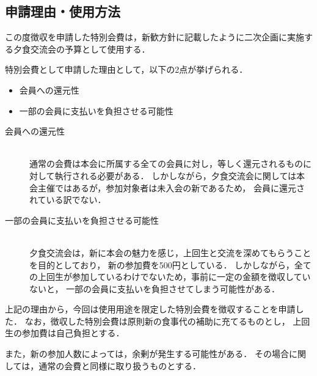 \subsection*{申請理由・使用方法}

この度徴収を申請した特別会費は，新歓方針に記載したように二次企画に実施する夕食交流会の予算として使用する．

特別会費として申請した理由として，以下の2点が挙げられる．
\begin{itemize}
    \item 会員への還元性
    \item 一部の会員に支払いを負担させる可能性
\end{itemize}

\begin{description}
    \item[会員への還元性]\mbox{}\\ %
        通常の会費は本会に所属する全ての会員に対し，等しく還元されるものに対して執行される必要がある．
        しかしながら，夕食交流会に関しては本会主催ではあるが，参加対象者は未入会の新\firstGrade{}であるため，
        会員に還元されている訳でない．

    \item[一部の会員に支払いを負担させる可能性]\mbox{}\\ %
        夕食交流会は，新\firstGrade{}に本会の魅力を感じ，上回生と交流を深めてもらうことを目的としており，
        新\firstGrade{}の参加費を500円としている．
        しかしながら，全ての上回生が参加しているわけでないため，事前に一定の金額を徴収していないと，
        一部の会員に支払いを負担させてしまう可能性がある．

 \end{description}

上記の理由から，今回は使用用途を限定した特別会費を徴収することを申請した．
なお，徴収した特別会費は原則新\firstGrade{}の食事代の補助に充てるものとし，
上回生の参加費は自己負担とする．

また，新\firstGrade{}の参加人数によっては，余剰が発生する可能性がある．
その場合に関しては，通常の会費と同様に取り扱うものとする．

